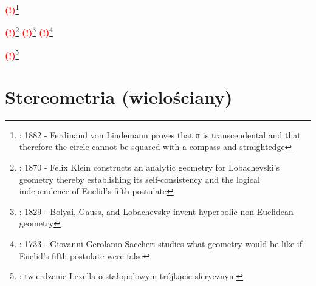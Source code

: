 \documentclass{greaseproof}
\newcommand{\todofoot}[1]{\textcolor{red}{\textbf{(!)}\footnote{\textbf{\color{red}{Do zrobienia}}: #1}}}
\begin{document}

\todofoot{1882 - Ferdinand von Lindemann proves that π is transcendental and that therefore the circle cannot be squared with a compass and straightedge}


\todofoot{1870 - Felix Klein constructs an analytic geometry for Lobachevski's geometry thereby establishing its self-consistency and the logical independence of Euclid's fifth postulate}
\todofoot{1829 - Bolyai, Gauss, and Lobachevsky invent hyperbolic non-Euclidean geometry}
\todofoot{1733 - Giovanni Gerolamo Saccheri studies what geometry would be like if Euclid's fifth postulate were false}

\todofoot{twierdzenie Lexella o stałopolowym trójkącie sferycznym}

\chapter{Stereometria (wielościany)}

\end{document}
